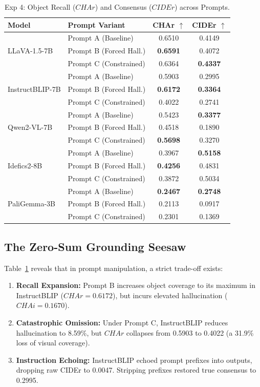 \documentclass[conference]{IEEEtran}
\begin{document}
\begin{table}[htbp]
\caption{Exp 4: Object Recall ($CHAr$) and Consensus ($CIDEr$) across Prompts.}
\label{tab:exp4_char_cider}
\centering
\begin{tabular}{llcc}
\toprule
\textbf{Model} & \textbf{Prompt Variant} & \textbf{CHAr} $\uparrow$ & \textbf{CIDEr} $\uparrow$ \\
\midrule
\multirow{3}{*}{LLaVA-1.5-7B} 
 & Prompt A (Baseline)     & 0.6510 & 0.4149 \\
 & Prompt B (Forced Hall.) & \textbf{0.6591} & 0.4072 \\
 & Prompt C (Constrained)  & 0.6364 & \textbf{0.4337} \\
\midrule
\multirow{3}{*}{InstructBLIP-7B} 
 & Prompt A (Baseline)     & 0.5903 & 0.2995 \\
 & Prompt B (Forced Hall.) & \textbf{0.6172} & \textbf{0.3364} \\
 & Prompt C (Constrained)  & 0.4022 & 0.2741 \\
\midrule
\multirow{3}{*}{Qwen2-VL-7B} 
 & Prompt A (Baseline)     & 0.5423 & \textbf{0.3377} \\
 & Prompt B (Forced Hall.) & 0.4518 & 0.1890 \\
 & Prompt C (Constrained)  & \textbf{0.5698} & 0.3270 \\
\midrule
\multirow{3}{*}{Idefics2-8B} 
 & Prompt A (Baseline)     & 0.3967 & \textbf{0.5158} \\
 & Prompt B (Forced Hall.) & \textbf{0.4256} & 0.4831 \\
 & Prompt C (Constrained)  & 0.3872 & 0.5034 \\
\midrule
\multirow{3}{*}{PaliGemma-3B} 
 & Prompt A (Baseline)     & \textbf{0.2467} & \textbf{0.2748} \\
 & Prompt B (Forced Hall.) & 0.2113 & 0.0917 \\
 & Prompt C (Constrained)  & 0.2301 & 0.1369 \\
\bottomrule
\end{tabular}
\end{table}

\subsection{The Zero-Sum Grounding Seesaw}
Table~\ref{tab:exp4_char_cider} reveals that in prompt manipulation, a strict trade-off exists:
\begin{enumerate}
    \item \textbf{Recall Expansion:} Prompt B increases object coverage to its maximum in InstructBLIP ($CHAr = 0.6172$), but incurs elevated hallucination ($CHAi = 0.1670$).
    \item \textbf{Catastrophic Omission:} Under Prompt C, InstructBLIP reduces hallucination to 8.59\%, but $CHAr$ collapses from 0.5903 to 0.4022 (a 31.9\% loss of visual coverage).
    \item \textbf{Instruction Echoing:} InstructBLIP echoed prompt prefixes into outputs, dropping raw CIDEr to 0.0047. Stripping prefixes restored true consensus to 0.2995.
\end{enumerate}
\end{document}

